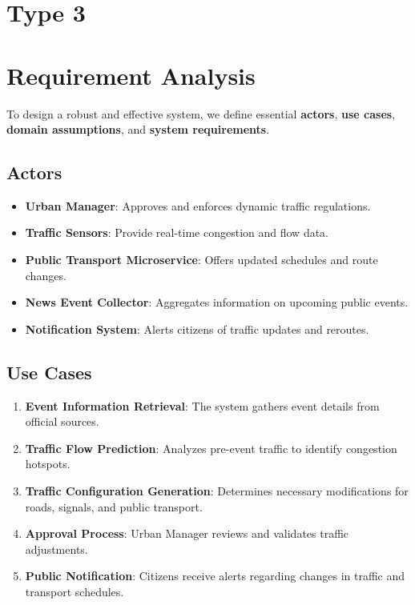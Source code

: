 \documentclass[a4paper,12pt]{article}
\begin{document}
\newpage

\section*{Type 3}
\section{Requirement Analysis}
To design a robust and effective system, we define essential \textbf{actors}, \textbf{use cases}, \textbf{domain assumptions}, and \textbf{system requirements}.

\subsection{Actors}
\begin{itemize}
    \item \textbf{Urban Manager}: Approves and enforces dynamic traffic regulations.
    \item \textbf{Traffic Sensors}: Provide real-time congestion and flow data.
    \item \textbf{Public Transport Microservice}: Offers updated schedules and route changes.
    \item \textbf{News Event Collector}: Aggregates information on upcoming public events.
    \item \textbf{Notification System}: Alerts citizens of traffic updates and reroutes.
\end{itemize}

\subsection{Use Cases}
\begin{enumerate}
    \item \textbf{Event Information Retrieval}: The system gathers event details from official sources.
    \item \textbf{Traffic Flow Prediction}: Analyzes pre-event traffic to identify congestion hotspots.
    \item \textbf{Traffic Configuration Generation}: Determines necessary modifications for roads, signals, and public transport.
    \item \textbf{Approval Process}: Urban Manager reviews and validates traffic adjustments.
    \item \textbf{Public Notification}: Citizens receive alerts regarding changes in traffic and transport schedules.
\end{enumerate}
\end{document}
